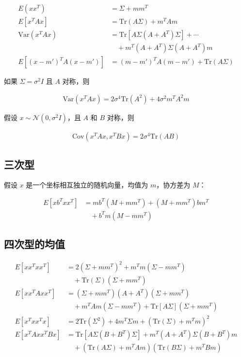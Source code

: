 \begin{align*}
E(xx^T) &= \Sigma + mm^T \tag{377} \\
E[x^TAx] &= \text{Tr}(A\Sigma) + m^TAm \tag{378} \\
\text{Var}(x^TAx) &= \text{Tr}[A\Sigma(A + A^T)\Sigma] + \cdots \tag{379} \\
&\quad +m^T(A + A^T)\Sigma(A + A^T)m \\
E[(x - m')^TA(x - m')] &= (m - m')^TA(m - m') + \text{Tr}(A\Sigma) \tag{380}
\end{align*}

如果 $\Sigma = \sigma^2I$ 且 $A$ 对称，则

\begin{align*}
\text{Var}(x^TAx) = 2\sigma^4\text{Tr}(A^2) + 4\sigma^2m^TA^2m \tag{381}
\end{align*}

假设 $x \sim \mathcal{N}(0, \sigma^2I)$，且 $A$ 和 $B$ 对称，则

\begin{align*}
\text{Cov}(x^TAx, x^TBx) = 2\sigma^4\text{Tr}(AB) \tag{382}
\end{align*}

\subsection{三次型}

假设 $x$ 是一个坐标相互独立的随机向量，均值为 $m$，协方差为 $M$：

\begin{align*}
E[xb^Txx^T] &= mb^T(M + mm^T) + (M + mm^T)bm^T \tag{383} \\
&\quad +b^Tm(M - mm^T)
\end{align*}

\subsection{四次型的均值}

\begin{align*}
E[xx^Txx^T] &= 2(\Sigma + mm^T)^2 + m^Tm(\Sigma - mm^T) \\
&\quad +\text{Tr}(\Sigma)(\Sigma + mm^T) \\[1em]
E[xx^TAxx^T] &= (\Sigma + mm^T)(A + A^T)(\Sigma + mm^T) \\
&\quad +m^TAm(\Sigma - mm^T) + \text{Tr}[A\Sigma](\Sigma + mm^T) \\[1em]
E[x^Txx^Tx] &= 2\text{Tr}(\Sigma^2) + 4m^T\Sigma m + (\text{Tr}(\Sigma) + m^Tm)^2 \\[1em]
E[x^TAxx^TBx] &= \text{Tr}[A\Sigma(B + B^T)\Sigma] + m^T(A + A^T)\Sigma(B + B^T)m \\
&\quad +(\text{Tr}(A\Sigma) + m^TAm)(\text{Tr}(B\Sigma) + m^TBm)
\end{align*}

